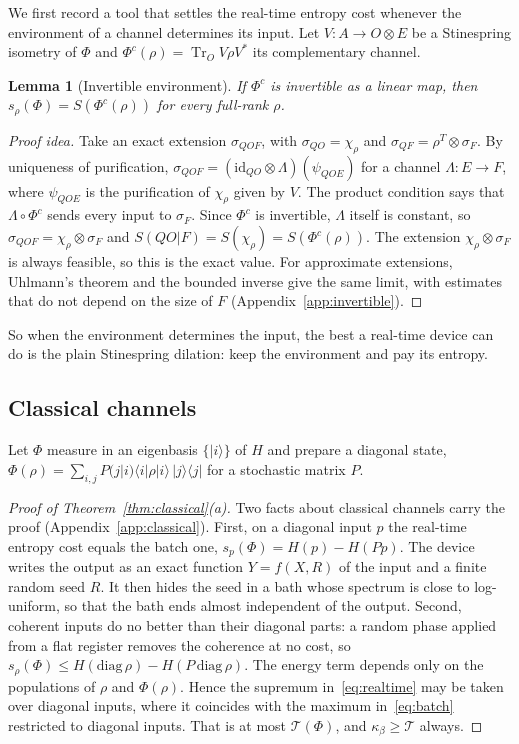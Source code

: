 \documentclass[11pt]{article}
\newtheorem{lemma}[theorem]{Lemma}
\theoremstyle{definition}
\theoremstyle{remark}
\newcommand{\Tr}{\operatorname{Tr}}
\newcommand{\Tcap}{\mathcal T}
\newcommand{\Trt}{\kappa_\beta}
\begin{document}
We first record a tool that settles the real-time entropy cost whenever the environment of a channel determines its input. Let $V:A\to O\otimes E$ be a Stinespring isometry of $\Phi$ and $\Phi^c(\rho)=\Tr_O V\rho V^*$ its complementary channel.

\begin{lemma}[Invertible environment]\label{lem:invertible}
If $\Phi^c$ is invertible as a linear map, then $s_\rho(\Phi)=S(\Phi^c(\rho))$ for every full-rank $\rho$.
\end{lemma}

\begin{proof}[Proof idea]
Take an exact extension $\sigma_{QOF}$, with $\sigma_{QO}=\chi_\rho$ and $\sigma_{QF}=\rho^T\otimes\sigma_F$. By uniqueness of purification, $\sigma_{QOF}=(\mathrm{id}_{QO}\otimes\Lambda)(\psi_{QOE})$ for a channel $\Lambda:E\to F$, where $\psi_{QOE}$ is the purification of $\chi_\rho$ given by $V$. The product condition says that $\Lambda\circ\Phi^c$ sends every input to $\sigma_F$. Since $\Phi^c$ is invertible, $\Lambda$ itself is constant, so $\sigma_{QOF}=\chi_\rho\otimes\sigma_F$ and $S(QO|F)=S(\chi_\rho)=S(\Phi^c(\rho))$. The extension $\chi_\rho\otimes\sigma_F$ is always feasible, so this is the exact value. For approximate extensions, Uhlmann's theorem and the bounded inverse give the same limit, with estimates that do not depend on the size of $F$ (Appendix~\ref{app:invertible}).
\end{proof}

So when the environment determines the input, the best a real-time device can do is the plain Stinespring dilation: keep the environment and pay its entropy.

\subsection{Classical channels}

Let $\Phi$ measure in an eigenbasis $\{|i\rangle\}$ of $H$ and prepare a diagonal state, $\Phi(\rho)=\sum_{i,j}P(j|i)\langle i|\rho|i\rangle\,|j\rangle\langle j|$ for a stochastic matrix $P$.

\begin{proof}[Proof of Theorem~\ref{thm:classical}(a)]
Two facts about classical channels carry the proof (Appendix~\ref{app:classical}). First, on a diagonal input $p$ the real-time entropy cost equals the batch one, $s_p(\Phi)=H(p)-H(Pp)$. The device writes the output as an exact function $Y=f(X,R)$ of the input and a finite random seed $R$. It then hides the seed in a bath whose spectrum is close to log-uniform, so that the bath ends almost independent of the output. Second, coherent inputs do no better than their diagonal parts: a random phase applied from a flat register removes the coherence at no cost, so $s_\rho(\Phi)\le H(\mathrm{diag}\,\rho)-H(P\,\mathrm{diag}\,\rho)$. The energy term depends only on the populations of $\rho$ and $\Phi(\rho)$. Hence the supremum in~\eqref{eq:realtime} may be taken over diagonal inputs, where it coincides with the maximum in~\eqref{eq:batch} restricted to diagonal inputs. That is at most $\Tcap(\Phi)$, and $\Trt\ge\Tcap$ always.
\end{proof}
\end{document}
